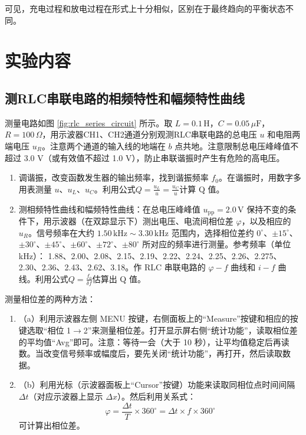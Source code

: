 \documentclass[zihao=5, UTF8]{article}
\theoremstyle{MyLineTheoremStyle} %
\theoremstyle{MyBlockTheoremStyle} %
\theoremstyle{MySubsubsectionStyle} %
\begin{document}
可见，充电过程和放电过程在形式上十分相似，区别在于最终趋向的平衡状态不同。


\section{实验内容}

\subsection{测RLC串联电路的相频特性和幅频特性曲线}
测量电路如图 \ref{fig:rlc_series_circuit} 所示。取 \( L = 0.1 \, \text{H} \)，\( C = 0.05 \, \mu\text{F} \)，\( R = 100 \, \Omega \)，用示波器CH1、CH2通道分别观测RLC串联电路的总电压 \( u \) 和电阻两端电压 \( u_R \)。注意两个通道的输入线的地端在 \( b \) 点共地。注意限制总电压峰峰值不超过 3.0 V（或有效值不超过 1.0 V），防止串联谐振时产生有危险的高电压。

\begin{enumerate}
  \item 调谐振，改变函数发生器的输出频率，找到谐振频率 \( f_0 \)。在谐振时，用数字多用表测量 \( u \)、\( u_L \)、\( u_C \)。利用公式$Q = \frac{u_L}{u} = \frac{u_C}{u}$计算 Q 值。
  \item 测相频特性曲线和幅频特性曲线：在总电压峰峰值 \( u_{\text{pp}} = 2.0 \, \text{V} \) 保持不变的条件下，用示波器（在双踪显示下）测出电压、电流间相位差 \( \varphi \)，以及相应的 \( u_R \)。信号频率在大约 \( 1.50 \, \text{kHz} \sim 3.30 \, \text{kHz} \) 范围内，选择相位差约 \( 0^\circ \)、\( \pm 15^\circ \)、\( \pm 30^\circ \)、\( \pm 45^\circ \)、\( \pm 60^\circ \)、\( \pm 72^\circ \)、\( \pm 80^\circ \) 所对应的频率进行测量。参考频率（单位 kHz）： 1.88、2.00、2.08、2.15、2.19、2.22、2.24、2.25、2.26、2.275、2.30、2.36、2.43、2.62、3.18。作 RLC 串联电路的 \( \varphi - f \) 曲线和 \( i - f \) 曲线。利用公式$Q = \frac{f_0}{\delta f}$估算出 Q 值。
\end{enumerate}

测量相位差的两种方法：
\begin{enumerate}
    \item （a）利用示波器左侧 MENU 按键，右侧面板上的“Measure”按键和相应的按键选取“相位 1\(\rightarrow\)2”来测量相位差。打开显示屏右侧“统计功能”，读取相位差的平均值“Avg”即可。注意：等待一会（大于 10 秒），让平均值稳定后再读数。当改变信号频率或幅度后，要先关闭“统计功能”，再打开，然后读取数据。
    \item （b）利用光标（示波器面板上“Cursor”按键）功能来读取同相位点时间间隔 \( \Delta t \)（对应示波器上显示 \( \Delta x \)）。然后利用关系式：
    \[
    \varphi = \frac{\Delta t}{T} \times 360^\circ = \Delta t \times f \times 360^\circ
    \]
    可计算出相位差。
\end{enumerate}
\end{document}
